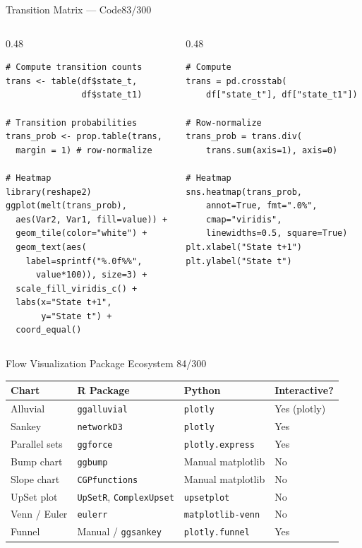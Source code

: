 \documentclass[10pt]{beamer}
\newcommand{\smark}[1]{\hfill{\scriptsize\color{codegray}#1}}
\begin{document}
\begin{frame}[fragile]{Transition Matrix --- Code}\smark{83/300}
\begin{columns}[T]
\begin{column}{0.48\textwidth}
\begin{lstlisting}[style=Rstyle]
# Compute transition counts
trans <- table(df$state_t,
               df$state_t1)

# Transition probabilities
trans_prob <- prop.table(trans,
  margin = 1) # row-normalize

# Heatmap
library(reshape2)
ggplot(melt(trans_prob),
  aes(Var2, Var1, fill=value)) +
  geom_tile(color="white") +
  geom_text(aes(
    label=sprintf("%.0f%%",
      value*100)), size=3) +
  scale_fill_viridis_c() +
  labs(x="State t+1",
       y="State t") +
  coord_equal()
\end{lstlisting}
\end{column}
\begin{column}{0.48\textwidth}
\begin{lstlisting}[style=Pystyle]
# Compute
trans = pd.crosstab(
    df["state_t"], df["state_t1"])

# Row-normalize
trans_prob = trans.div(
    trans.sum(axis=1), axis=0)

# Heatmap
sns.heatmap(trans_prob,
    annot=True, fmt=".0%",
    cmap="viridis",
    linewidths=0.5, square=True)
plt.xlabel("State t+1")
plt.ylabel("State t")
\end{lstlisting}
\end{column}
\end{columns}
\end{frame}

\begin{frame}{Flow Visualization Package Ecosystem}
\smark{84/300}
\centering\small
\begin{tabular}{@{}llll@{}}
    \toprule
    \textbf{Chart} & \textbf{R Package} & \textbf{Python} & \textbf{Interactive?} \\
    \midrule
    Alluvial        & \texttt{ggalluvial}         & \texttt{plotly}             & Yes (plotly) \\
    Sankey          & \texttt{networkD3}          & \texttt{plotly}             & Yes \\
    Parallel sets   & \texttt{ggforce}            & \texttt{plotly.express}     & Yes \\
    Bump chart      & \texttt{ggbump}             & Manual matplotlib           & No \\
    Slope chart     & \texttt{CGPfunctions}       & Manual matplotlib           & No \\
    UpSet plot      & \texttt{UpSetR}, \texttt{ComplexUpset} & \texttt{upsetplot} & No \\
    Venn / Euler    & \texttt{eulerr}             & \texttt{matplotlib-venn}    & No \\
    Funnel          & Manual / \texttt{ggsankey}  & \texttt{plotly.funnel}      & Yes \\
    \bottomrule
\end{tabular}
\end{frame}
\end{document}

